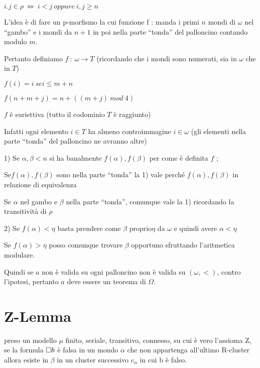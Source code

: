 $i.j\in\rho\ \iff\ i<j\ oppure\ i,j\geq n$ 

L'idea è di fare un p-morfismo la cui funzione f : manda i primi $n$
mondi di $\omega$ nel ``gambo'' e i mondi da $n+1$ in poi nella
parte ``tonda'' del palloncino contando modulo $m$.

Pertanto definiamo $f\ :\ \omega\rightarrow T$ (ricordando che i
mondi sono numerati, sia in $\omega$ che in $T$)

$f(i)=i\ se$$i\leq m+n$

$f(n+m+j)=n+((m+j)\ mod\ 4)$

$f$ è suriettiva (tutto il codominio $T$ è raggiunto)

Infatti ogni elemento $i\in T$ ha almeno controimmagine $i\in\omega$
(gli elementi nella parte ``tonda'' del palloncino ne avranno altre)


1) Se $\alpha,\beta<n$ si ha banalmente $f(\alpha),f(\beta)$ per
come è definita $f$ ;

Se$f(\alpha),f(\beta)$ sono nella parte ``tonda'' la 1) vale perché
$f(\alpha),f(\beta)$ in relazione di equivalenza

Se $\alpha$ nel gambo e $\beta$ nella parte ``tonda'', comunque
vale la 1) ricordando la transitività di $\rho$

2) Se $f(\alpha)<\eta$ basta prendere come $\beta$ proprio$\eta$
da $\omega$ e quindi avere $\alpha<\eta$

Se $f(\alpha)>\eta$ posso comunque trovare \textbf{$\beta$ }opportuno
sfruttando l'aritmetica modulare.



Quindi se $a$ non è valida su ogni palloncino non è valida su $(\omega,<)$,
contro l’ipotesi, pertanto $a$ deve essere un teorema di $\Omega$.


\section{Z-Lemma}

preso un modello $\mu$ finito, seriale, transitivo, connesso, su
cui è vero l'assioma Z, se la formula $\square b$ è falsa in un mondo
$\alpha$ che non appartenga all'ultimo R-cluster allora esiste in
$\beta$ in un cluster successivo $c_{\alpha}$ in cui b è falso.

